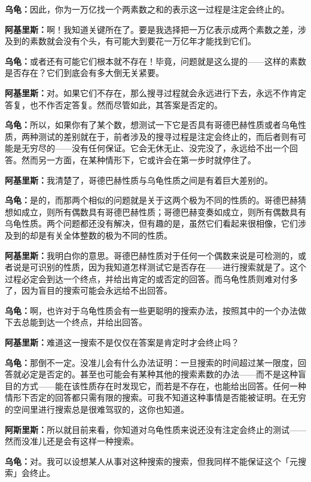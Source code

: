 \documentclass[
  12pt,
  twoside,
  openright,
  oldfontcommands,
]{memoir}
\newcommand{\dialogname}[1]{{\heifamily\bfseries #1}}
\begin{document}
\dialogname{乌龟：}因此，你为一万亿找一个两素数之和的表示这一过程是注定会终止的。

\dialogname{阿基里斯：}啊！我知道关键所在了。要是我选择把一万亿表示成两个素数之差，涉及到的素数就会没有个头，有可能大到要花一万亿年才能找到它们。

\dialogname{乌龟：}或者还有可能它们根本就不存在！毕竟，问题就是这么提的------这样的素数是否存在？它们到底会有多大倒无关紧要。

\dialogname{阿基里斯：}对。如果它们不存在，那么搜寻过程就会永远进行下去，永远不作肯定答复，也不作否定答复。然而尽管如此，其答案是否定的。

\dialogname{乌龟：}所以，如果你有了某个数，想测试一下它是否具有哥德巴赫性质或者乌龟性质，两种测试的差别就在于，前者涉及的搜寻过程是注定会终止的，而后者则有可能是无穷尽的------没有任何保证。它会无休无止、没完没了，永远给不出一个回答。然而另一方面，在某种情形下，它或许会在第一步时就停住了。

\dialogname{阿基里斯：}我清楚了，哥德巴赫性质与乌龟性质之间是有着巨大差别的。

\dialogname{乌龟：}是的，而那两个相似的问题就是关于这两个极为不同的性质的。哥德巴赫猜想如成立，则所有偶数具有哥德巴赫性质；哥德巴赫变奏如成立，则所有偶数具有乌龟性质。两个问题都还没有解决，但有趣的是，虽然它们看起来很相像，它们涉及到的却是有关全体整数的极为不同的性质。

\dialogname{阿基里斯：}我明白你的意思。哥德巴赫性质对于任何一个偶数来说是可检测的，或者说是可识别的性质，因为我知道怎样测试它是否存在------进行搜索就是了。这个过程必定会到达一个终点，并给出肯定的或否定的回答。而乌龟性质则难对付多了，因为盲目的搜索可能会永远给不出回答。

\dialogname{乌龟：}啊，也许对于乌龟性质会有一些更聪明的搜索办法，按照其中的一个办法做下去总能到达一个终点，并给出回答。

\dialogname{阿基里斯：}难道这一搜索不是仅仅在答案是肯定时才会终止吗？

\dialogname{乌龟：}那倒不一定。没准儿会有什么办法证明：一旦搜索的时间超过某一限度，回答就必定是否定的。甚至也可能会有某种其他的搜索素数的办法------而不是这种盲目的方式------能在该性质存在时发现它，而若是不存在，也能给出回答。任何一种情形下否定的回答都只需有限的搜索。可我不知道这种事情是否能被证明。在无穷的空间里进行搜索总是很难驾驭的，这你也知道。

\dialogname{阿斯里斯：}所以就目前来看，你知道对乌龟性质来说还没有注定会终止的测试------然而没准儿还是会有这样一种搜索。

\dialogname{乌龟：}对。我可以设想某人从事对这种搜索的搜索，但我同样不能保证这个「元搜索」会终止。
\end{document}
